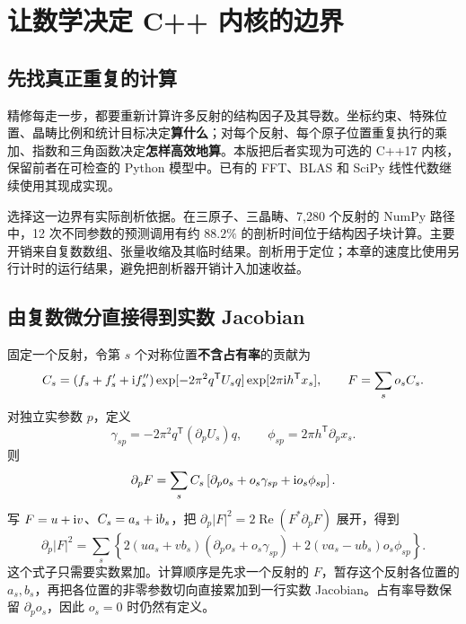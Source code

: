 \chapter{让数学决定 C++ 内核的边界}\label{chap:kernels}

\section{先找真正重复的计算}
精修每走一步，都要重新计算许多反射的结构因子及其导数。坐标约束、特殊位置、晶畴比例和统计目标决定\textbf{算什么}；对每个反射、每个原子位置重复执行的乘加、指数和三角函数决定\textbf{怎样高效地算}。本版把后者实现为可选的 C++17 内核，保留前者在可检查的 Python 模型中。已有的 FFT、BLAS 和 SciPy 线性代数继续使用其现成实现。

选择这一边界有实际剖析依据。在三原子、三晶畴、7,280 个反射的 NumPy 路径中，12 次不同参数的预测调用有约 $88.2\%$ 的剖析时间位于结构因子块计算。主要开销来自复数数组、张量收缩及其临时结果。剖析用于定位；本章的速度比使用另行计时的运行结果，避免把剖析器开销计入加速收益。

\section{由复数微分直接得到实数 Jacobian}
固定一个反射，令第 $s$ 个对称位置\textbf{不含占有率}的贡献为
\begin{equation}
 C_s=(f_s+f_s'+\mathrm{i} f_s'')
      \exp[-2\pi^2q^{\mathsf T}U_s q]
      \exp[2\pi\mathrm{i} h^{\mathsf T}x_s],
 \qquad F=\sum_s o_s C_s .
\end{equation}
对独立实参数 $p$，定义
\begin{equation}
 \gamma_{sp}=-2\pi^2q^{\mathsf T}(\partial_pU_s)q,
 \qquad \phi_{sp}=2\pi h^{\mathsf T}\partial_px_s .
\end{equation}
则
\begin{equation}
 \partial_p F=\sum_s C_s
   \left[\partial_po_s+o_s\gamma_{sp}+\mathrm{i} o_s\phi_{sp}\right].
\end{equation}
写 $F=u+\mathrm{i} v$、$C_s=a_s+\mathrm{i} b_s$，把
$\partial_p|F|^2=2\operatorname{Re}(F^*\partial_pF)$ 展开，得到
\begin{equation}\label{eq:fused-kernel-jacobian}
 \boxed{\partial_p|F|^2=
 \sum_s \left\{
 2(ua_s+vb_s)(\partial_po_s+o_s\gamma_{sp})
 +2(va_s-ub_s)o_s\phi_{sp}\right\}.}
\end{equation}
这个式子只需要实数累加。计算顺序是先求一个反射的 $F$，暂存这个反射各位置的 $a_s,b_s$，再把各位置的非零参数切向直接累加到一行实数 Jacobian。占有率导数保留 $\partial_po_s$，因此 $o_s=0$ 时仍然有定义。


